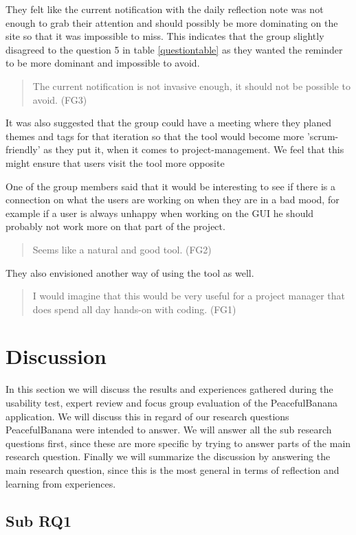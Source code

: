 They felt like the current notification with the daily reflection note was not enough to grab their attention and should possibly be more dominating on the site so that it was impossible to miss. This indicates that the group slightly disagreed to the question 5 in table \ref{questiontable} as they wanted the reminder to be more dominant and impossible to avoid.
\begin{quote}
The current notification is not invasive enough, it should not be possible to avoid. (FG3)
\end{quote}

It was also suggested that the group could have a meeting where they planed themes and tags for that iteration so that the tool would become more 'scrum-friendly' as they put it, when it comes to project-management. We feel that this might ensure that users visit the tool more opposite 

One of the group members said that it would be interesting to see if there is a connection on what the users are working on when they are in a bad mood, for example if a user is always unhappy when working on the GUI he should probably not work more on that part of the project.

\begin{quote}
Seems like a natural and good tool. (FG2)
\end{quote}

They also envisioned another way of using the tool as well.
\begin{quote}
I would imagine that this would be very useful for a project manager that does spend all day hands-on with coding. (FG1)
\end{quote}


\section{Discussion}
In this section we will discuss the results and experiences gathered during the usability test, expert review and focus group evaluation of the PeacefulBanana application. We will discuss this in regard of our research questions PeacefulBanana were intended to answer. We will answer all the sub research questions first, since these are more specific by trying to answer parts of the main research question. Finally we will summarize the discussion by answering the main research question, since this is the most general in terms of reflection and learning from experiences. 

\subsection{Sub RQ1}
\noindent\makebox[\linewidth]{\rule{\textwidth}{0.5pt}} 

